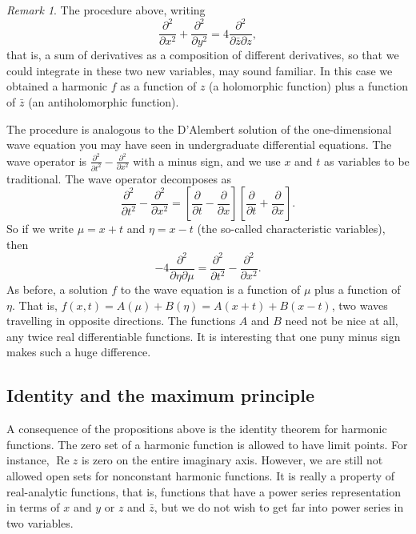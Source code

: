 \documentclass[12pt,openany]{book}
\renewcommand{\Re}{\operatorname{Re}}
\theoremstyle{plain}
\theoremstyle{remark}
\newtheorem{remark}[thm]{Remark}
\theoremstyle{definition}
\theoremstyle{exercise}
\theoremstyle{example}
\begin{document}
\begin{remark}
The procedure above, writing
\begin{equation*}
\frac{\partial^2}{\partial x^2}+ \frac{\partial^2}{\partial y^2} = 
4 \frac{\partial^2}{\partial \bar{z} \partial z} ,
\end{equation*}
that is, a sum of derivatives as a composition of
different derivatives,
so that we could integrate in these two new variables, may
sound familiar.  In this case we obtained a harmonic $f$ as a function
of $z$ (a holomorphic function) plus a function of $\bar{z}$ (an
antiholomorphic function).

The procedure is analogous to the D'Alembert solution of the one-dimensional
wave equation you may have seen in undergraduate differential equations.
The wave operator is
$\frac{\partial^2}{\partial t^2}- \frac{\partial^2}{\partial x^2}$ with a
minus sign, and we use $x$ and $t$ as variables to be traditional.
The wave operator decomposes as
\begin{equation*}
\frac{\partial^2}{\partial t^2}- \frac{\partial^2}{\partial x^2}
=
\left[ \frac{\partial}{\partial t}- \frac{\partial}{\partial x}
\right]
\left[ \frac{\partial}{\partial t}+ \frac{\partial}{\partial x}
\right] .
\end{equation*}
So if we write $\mu = x+t$ and $\eta = x-t$ (the so-called characteristic
variables), then
\begin{equation*}
-4 \frac{\partial^2}{\partial \eta \partial \mu} = 
\frac{\partial^2}{\partial t^2}- \frac{\partial^2}{\partial x^2} .
\end{equation*}
As before, a solution $f$ to the wave equation is a function
of $\mu$ plus a function of $\eta$.  That is, $f(x,t) = A(\mu) + B(\eta) =
A(x+t)+B(x-t)$, two waves travelling in opposite directions.  The
functions $A$ and $B$ need not be nice at all, any twice real differentiable
functions.
It is interesting that one puny minus sign makes such a huge difference.
\end{remark}

\subsection{Identity and the maximum principle}

A consequence of the propositions above is the identity theorem
for harmonic functions.
The zero set of a harmonic function is allowed to have limit points.
For instance, $\Re z$ is zero on the entire imaginary
axis.  However, we are still not allowed open sets for nonconstant harmonic
functions.  It is really a property of real-analytic functions, that is,
functions that have a power series representation in terms of $x$ and $y$
or $z$ and $\bar{z}$, but we do not wish to get far into power series in two
variables.
\end{document}
